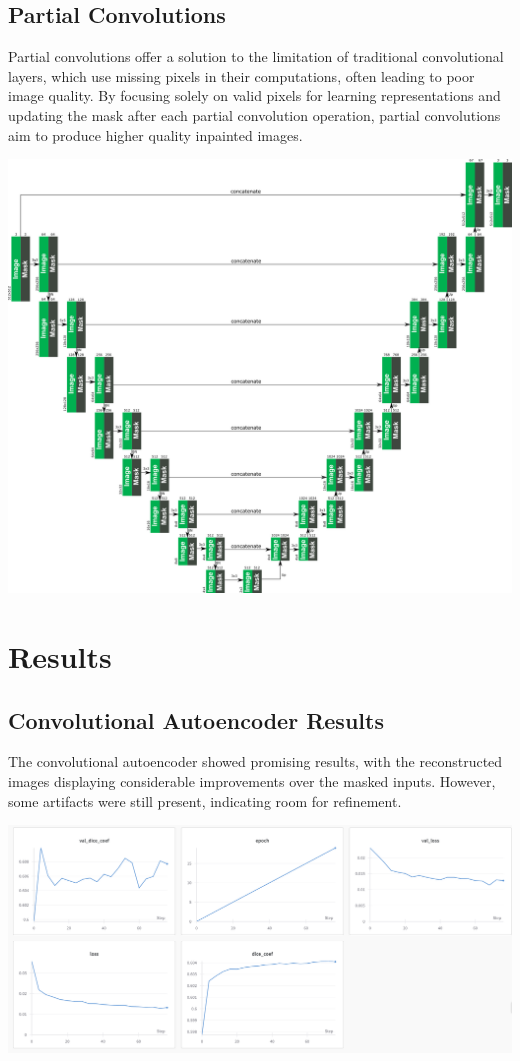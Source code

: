 \documentclass[12pt,a4paper]{article}
\begin{document}
\subsection{Partial Convolutions}
Partial convolutions offer a solution to the limitation of traditional convolutional layers, which use missing pixels in their computations, often leading to poor image quality. By focusing solely on valid pixels for learning representations and updating the mask after each partial convolution operation, partial convolutions aim to produce higher quality inpainted images.
\begin{center}
	\includegraphics[scale=0.2]{partial3.png}
\end{center}
\section{Results}

\subsection{Convolutional Autoencoder Results}
The convolutional autoencoder showed promising results, with the reconstructed images displaying considerable improvements over the masked inputs. However, some artifacts were still present, indicating room for refinement.

\begin{center}
	\includegraphics[scale=0.3]{result1.png}
\end{center}
\end{document}

